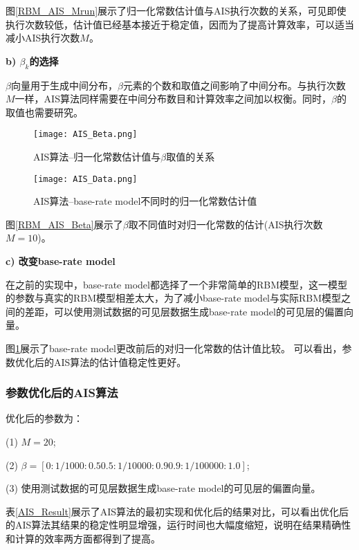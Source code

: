 \documentclass[11pt]{article}
\begin{document}
图\ref{RBM_AIS_Mrun}展示了归一化常数估计值与AIS执行次数的关系，可见即使执行次数较低，估计值已经基本接近于稳定值，因而为了提高计算效率，可以适当减小AIS执行次数$M$。


\noindent\textbf{b) $\beta_{k}$的选择}

$\beta$向量用于生成中间分布，$\beta$元素的个数和取值之间影响了中间分布。与执行次数$M$一样，AIS算法同样需要在中间分布数目和计算效率之间加以权衡。同时，$\beta$的取值也需要研究。

\begin{figure}
\begin{minipage}[t]{0.5\linewidth}
    \centering
    \texttt{[image: AIS\_Beta.png]}
    \caption{\scriptsize{AIS算法--归一化常数估计值与$\beta$取值的关系}}
    \label{RBM_AIS_Beta}
\end{minipage}
\begin{minipage}[t]{0.5\linewidth}
    \centering
    \texttt{[image: AIS\_Data.png]}
    \caption{\scriptsize{AIS算法--base-rate model不同时的归一化常数估计值}}
    \label{RBM_AIS_Data}
\end{minipage}
\end{figure}

图\ref{RBM_AIS_Beta}展示了$\beta$取不同值时对归一化常数的估计(AIS执行次数$M = 10$)。

\noindent\textbf{c) 改变base-rate model}

在之前的实现中，base-rate model都选择了一个非常简单的RBM模型，这一模型的参数与真实的RBM模型相差太大，为了减小base-rate model与实际RBM模型之间的差距，可以使用测试数据的可见层数据生成base-rate model的可见层的偏置向量。

图\ref{RBM_AIS_Data}展示了base-rate model更改前后的对归一化常数的估计值比较。
可以看出，参数优化后的AIS算法的估计值稳定性更好。

\subsubsection{参数优化后的AIS算法}
优化后的参数为：

(1) $M = 20$;

(2) $\beta = [0:1/1000:0.5 0.5:1/10000:0.9 0.9:1/100000:1.0]$;

(3) 使用测试数据的可见层数据生成base-rate model的可见层的偏置向量。

表\ref{AIS_Result}展示了AIS算法的最初实现和优化后的结果对比，可以看出优化后的AIS算法其结果的稳定性明显增强，运行时间也大幅度缩短，说明在结果精确性和计算的效率两方面都得到了提高。
\end{document}
